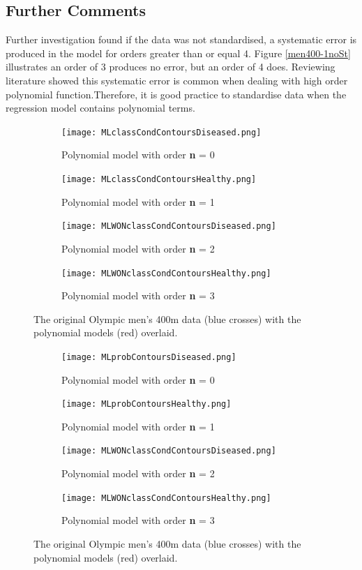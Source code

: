 {\subsection{Further Comments}
Further investigation found if the data was not standardised, a systematic error is produced in the model for orders greater than or equal 4. Figure \ref{men400-1noSt} illustrates an order of 3 produces no error, but an order of 4 does. Reviewing literature showed this systematic error is common when dealing with high order polynomial function\cite{WhenIsIt}.Therefore, it is good practice to standardise data when the regression model contains polynomial terms.

\begin{figure}[h!] 
	\centering
	\begin{subfigure}[b]{0.4\textwidth}
		\texttt{[image: MLclassCondContoursDiseased.png]}
		\caption{Polynomial model with order \textbf{n} = 0}
		\label{fig:model0}
	\end{subfigure}
	\begin{subfigure}[b]{0.4\textwidth}
		\texttt{[image: MLclassCondContoursHealthy.png]}
		\caption{Polynomial model with order \textbf{n} = 1}
		\label{fig:model1}
	\end{subfigure}
	\begin{subfigure}[b]{0.4\textwidth}
		\texttt{[image: MLWONclassCondContoursDiseased.png]}
		\caption{Polynomial model with order \textbf{n} = 2}
		\label{fig:model2}
	\end{subfigure}
	\begin{subfigure}[b]{0.4\textwidth}
		\texttt{[image: MLWONclassCondContoursHealthy.png]}
		\caption{Polynomial model with order \textbf{n} = 3}
		\label{fig:model3}
	\end{subfigure}
	\caption{The original Olympic men's 400m data (blue crosses) with the polynomial models (red) overlaid.}
	\label{men400-1}
\end{figure}

\begin{figure}[h!] 
	\centering
	\begin{subfigure}[b]{0.4\textwidth}
		\texttt{[image: MLprobContoursDiseased.png]}
		\caption{Polynomial model with order \textbf{n} = 0}
		\label{fig:model0}
	\end{subfigure}
	\begin{subfigure}[b]{0.4\textwidth}
		\texttt{[image: MLprobContoursHealthy.png]}
		\caption{Polynomial model with order \textbf{n} = 1}
		\label{fig:model1}
	\end{subfigure}
	\begin{subfigure}[b]{0.4\textwidth}
		\texttt{[image: MLWONclassCondContoursDiseased.png]}
		\caption{Polynomial model with order \textbf{n} = 2}
		\label{fig:model2}
	\end{subfigure}
	\begin{subfigure}[b]{0.4\textwidth}
		\texttt{[image: MLWONclassCondContoursHealthy.png]}
		\caption{Polynomial model with order \textbf{n} = 3}
		\label{fig:model3}
	\end{subfigure}
	\caption{The original Olympic men's 400m data (blue crosses) with the polynomial models (red) overlaid.}
	\label{men400-1}
\end{figure}

}
